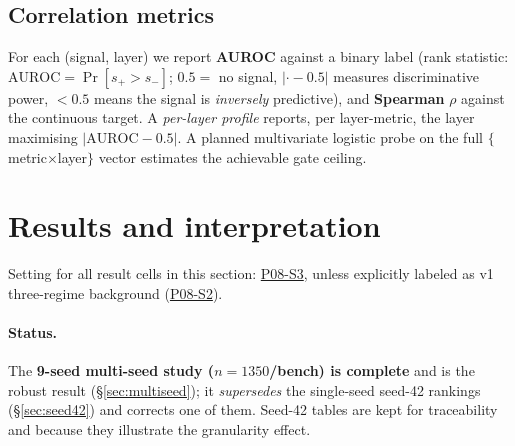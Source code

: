 \documentclass[11pt]{article}
\begin{document}
\subsection{Correlation metrics}
\label{sec:corr}
For each (signal, layer) we report \textbf{AUROC} against a binary label
(rank statistic: $\mathrm{AUROC}=\Pr[s_{+}>s_{-}]$; $0.5=$ no signal,
$|{\cdot}-0.5|$ measures discriminative power, $<0.5$ means the signal is
\emph{inversely} predictive), and \textbf{Spearman} $\rho$ against the
continuous target. A \emph{per-layer profile} reports, per layer-metric,
the layer maximising $|\mathrm{AUROC}-0.5|$. A planned multivariate
logistic probe on the full $\{$metric$\times$layer$\}$ vector estimates
the achievable gate ceiling.

\section{Results and interpretation}
\label{sec:results}

Setting for all result cells in this section:
\href{https://github.com/BDeMo/research-notes/blob/main/notes/plans/08-model-outputs-delta-w/settings.md#p08-s3--v15-intrinsic-signal-probe}{P08-S3},
unless explicitly labeled as v1 three-regime background
(\href{https://github.com/BDeMo/research-notes/blob/main/notes/plans/08-model-outputs-delta-w/settings.md#p08-s2--v1-phase-y-three-regime-benchmark-cells}{P08-S2}).

\paragraph{Status.} The \textbf{9-seed multi-seed study
($n{=}1350$/bench) is complete} and is the robust result
(\S\ref{sec:multiseed}); it \emph{supersedes} the single-seed seed-42
rankings (\S\ref{sec:seed42}) and corrects one of them. Seed-42 tables
are kept for traceability and because they illustrate the granularity
effect.
\end{document}
